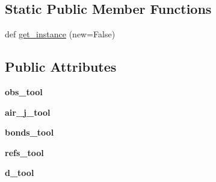 \subsection*{Static Public Member Functions}
\begin{DoxyCompactItemize}
\item 
def \hyperlink{classMIS_1_1Muon__Imaging__Algorithm_1_1InvDataFactory_1_1DataManage_1_1DataManager_aa579ea91d046211da0f2b999ba5f8558}{get\+\_\+instance} (new=False)
\end{DoxyCompactItemize}
\subsection*{Public Attributes}
\begin{DoxyCompactItemize}
\item 
\mbox{\label{classMIS_1_1Muon__Imaging__Algorithm_1_1InvDataFactory_1_1DataManage_1_1DataManager_a9add31c7b31f7b9c8ce7629a5ec1a8d1}} 
{\bfseries obs\+\_\+tool}
\item 
\mbox{\label{classMIS_1_1Muon__Imaging__Algorithm_1_1InvDataFactory_1_1DataManage_1_1DataManager_aefc13860fc419e52b01d307c89ab18bb}} 
{\bfseries air\+\_\+j\+\_\+tool}
\item 
\mbox{\label{classMIS_1_1Muon__Imaging__Algorithm_1_1InvDataFactory_1_1DataManage_1_1DataManager_a98ea35ce49baadadc0470438d9138147}} 
{\bfseries bonds\+\_\+tool}
\item 
\mbox{\label{classMIS_1_1Muon__Imaging__Algorithm_1_1InvDataFactory_1_1DataManage_1_1DataManager_a0f4bc69aac2da6cd15f297c25a821457}} 
{\bfseries refs\+\_\+tool}
\item 
\mbox{\label{classMIS_1_1Muon__Imaging__Algorithm_1_1InvDataFactory_1_1DataManage_1_1DataManager_afb8e8cfe993c2ee425ab6f2cb94e7e0f}} 
{\bfseries d\+\_\+tool}
\item 
\mbox{\label{classMIS_1_1Muon__Imaging__Algorithm_1_1InvDataFactory_1_1DataManage_1_1DataManager_a942f19bb5bf1f16f5902b4b08c411d9f}} 

\end{DoxyCompactItemize}
